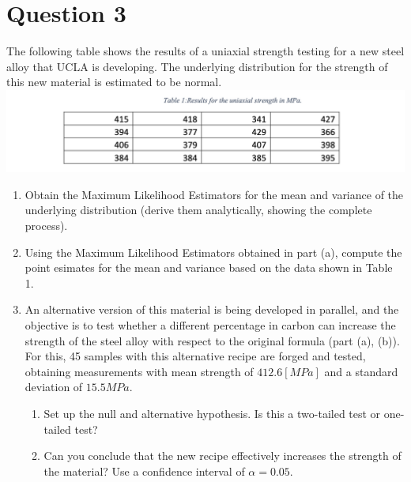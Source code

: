 \documentclass[13pt]{article}
\begin{document}
\newpage
\section*{Question 3}
The following table shows the results of a uniaxial strength testing for a new steel alloy that
UCLA is developing. The underlying distribution for the strength of this new material is estimated
to be normal. \\
\includegraphics[scale=0.65]{table}
\begin{enumerate}[label=(\alph*)]
\item Obtain the Maximum Likelihood Estimators for the mean and variance of the underlying distribution
  (derive them analytically, showing the complete process).
\item Using the Maximum Likelihood Estimators obtained in part (a), compute the point esimates for the
  mean and variance based on the data shown in Table 1.
\item An alternative version of this material is being developed in parallel, and the objective is to test
  whether a different percentage in carbon can increase the strength of the steel alloy with respect to the
  original formula (part (a), (b)). For this, 45 samples with this alternative recipe are forged and tested,
  obtaining measurements with mean strength of $412.6 [MPa]$ and a standard deviation of $15.5 MPa$.
  \begin{enumerate}[label=(\roman*)]
  \item Set up the null and alternative hypothesis. Is this a two-tailed test or one-tailed test?
  \item Can you conclude that the new recipe effectively increases the strength of the material? Use a
    confidence interval of $\alpha = 0.05$.
  \end{enumerate}
\end{enumerate}
\end{document}
